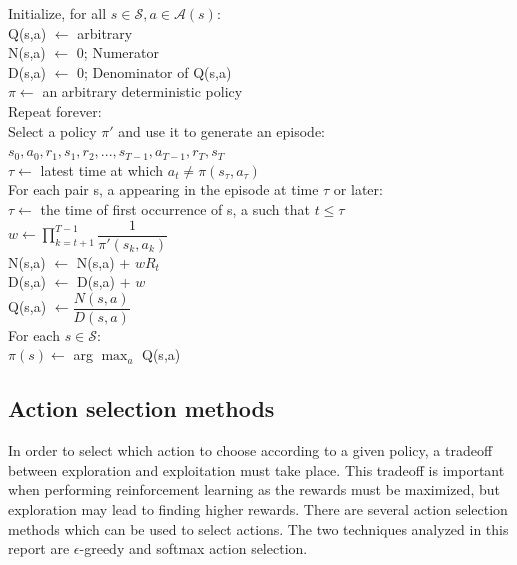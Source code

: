 \documentclass{article}
\newcommand{\tab}{\hspace{10mm}}
\newcommand{\dtab}{\hspace{20mm}}
\begin{document}
 
\begin{center}
\begin{mdframed}
\begin{algorithm}[H]
Initialize, for all $s \in \mathcal{S}, a \in \mathcal{A}(s)$:\\
\tab Q(s,a) $\leftarrow$ arbitrary\\
\tab N(s,a) $\leftarrow$ 0; Numerator\\
\tab D(s,a) $\leftarrow$ 0; Denominator of Q(s,a)\\
\tab $\pi \leftarrow$ an arbitrary deterministic policy\\

Repeat forever:\\
\tab Select a policy $\pi '$ and use it to generate an episode:\\
\dtab $s_0, a_0, r_1, s_1, r_2, ..., s_{T-1}, a_{T-1}, r_T, s_T$ \\
\tab $\tau \leftarrow$ latest time at which $a_t \neq \pi (s_{\tau}, a_{\tau})$\\
\tab For each pair s, a appearing in the episode at time $\tau$ or later:\\
\dtab $\tau \leftarrow$ the time of first occurrence of s, a such that $t \leq \tau$\\
\dtab $w \leftarrow \prod\limits_{k=t+1}^{T-1} \dfrac{1}{\pi'(s_k, a_k)}$\\
\dtab N(s,a) $\leftarrow$ N(s,a) + $wR_t$\\
\dtab D(s,a) $\leftarrow$ D(s,a) + $w$ \\
\dtab Q(s,a) $\leftarrow \dfrac{N(s,a)}{D(s,a)}$ \\
\tab For each $s \in \mathcal{S}$: \\
\dtab $\pi(s) \leftarrow$ arg $\max_a$ Q(s,a)\\
\end{algorithm}
\end{mdframed}
\label{alg:OFFMC}
\end{center}



\subsection{Action selection methods}
In order to select which action to choose according to a given policy, a tradeoff between exploration and exploitation must take place. This tradeoff is important when performing reinforcement learning as the rewards must be maximized, but exploration may lead to finding higher rewards. There are several action selection methods which can be used to select actions. The two techniques analyzed in this report are $\epsilon$-greedy and softmax action selection.
\end{document}
